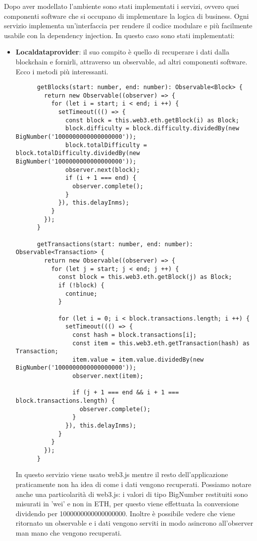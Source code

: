 Dopo aver modellato l'ambiente sono stati implementati i servizi, ovvero quei componenti software che si occupano di implementare la logica di business.
Ogni servizio implementa un'interfaccia per rendere il codice modulare e più facilmente usabile con la dependency injection.
In questo caso sono stati implementati:
\begin{itemize}
    \item {\bfseries Localdataprovider}: il suo compito è quello di recuperare i dati dalla blockchain e fornirli, attraverso un observable, ad altri componenti software.
    Ecco i metodi più interessanti.

    \begin{lstlisting}
      getBlocks(start: number, end: number): Observable<Block> {
        return new Observable((observer) => {
          for (let i = start; i < end; i ++) {
            setTimeout((() => {
              const block = this.web3.eth.getBlock(i) as Block;
              block.difficulty = block.difficulty.dividedBy(new BigNumber('1000000000000000000'));
              block.totalDifficulty = block.totalDifficulty.dividedBy(new BigNumber('1000000000000000000'));
              observer.next(block);
              if (i + 1 === end) {
                observer.complete();
              }
            }), this.delayInms);
          }
        });
      }

      getTransactions(start: number, end: number): Observable<Transaction> {
        return new Observable((observer) => {
          for (let j = start; j < end; j ++) {
            const block = this.web3.eth.getBlock(j) as Block;
            if (!block) {
              continue;
            }

            for (let i = 0; i < block.transactions.length; i ++) {
              setTimeout((() => {
                const hash = block.transactions[i];
                const item = this.web3.eth.getTransaction(hash) as Transaction;
                item.value = item.value.dividedBy(new BigNumber('1000000000000000000'));
                observer.next(item);

                if (j + 1 === end && i + 1 === block.transactions.length) {
                  observer.complete();
                }
              }), this.delayInms);
            }
          }
        });
      }
    \end{lstlisting}
    In questo servizio viene usato web3.js mentre il resto dell'applicazione praticamente non ha idea di come i dati vengono recuperati.
    Possiamo notare anche una particolarità di web3.js: i valori di tipo BigNumber restituiti sono misurati in 'wei' e non in ETH, per questo viene effettuata la conversione dividendo per 1000000000000000000.
    Inoltre è possibile vedere che viene ritornato un observable e i dati vengono serviti in modo asincrono all'observer man mano che vengono recuperati.


\end{itemize}
